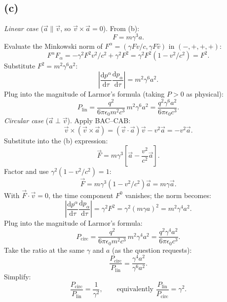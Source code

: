 \documentclass[11pt]{article}
\newcommand{\de}{\mathrm{d}}
\begin{document}
\subsection*{(c)}
\textit{Linear case} ($\vec a\parallel\vec v$, so $\vec v\times\vec a=0$). From (b):
\[ F=m\gamma^{3}a. \]
Evaluate the Minkowski norm of $F^{\alpha}=(\gamma Fv/c,\gamma F\hat v)$ in $(-,+,+,+)$:
\[ F^{\alpha}F_{\alpha}=-\gamma^{2}F^{2}v^{2}/c^{2}+\gamma^{2}F^{2}=\gamma^{2}F^{2}(1-v^{2}/c^{2})=F^{2}. \]
Substitute $F^{2}=m^{2}\gamma^{6}a^{2}$:
\[ \left|\frac{\de p^{\alpha}}{\de\tau}\frac{\de p_{\alpha}}{\de\tau}\right|=m^{2}\gamma^{6}a^{2}. \]
Plug into the magnitude of Larmor's formula (taking $P>0$ as physical):
\[ P_{\mathrm{lin}}=\frac{q^{2}}{6\pi\epsilon_{0}m^{2}c^{3}}\,m^{2}\gamma^{6}a^{2}=\frac{q^{2}\gamma^{6}a^{2}}{6\pi\epsilon_{0}c^{3}}. \]
\textit{Circular case} ($\vec a\perp\vec v$). Apply BAC--CAB:
\[ \vec v\times(\vec v\times\vec a)=(\vec v\cdot\vec a)\vec v-v^{2}\vec a=-v^{2}\vec a. \]
Substitute into the (b) expression:
\[ \vec F=m\gamma^{3}\!\left[\vec a-\frac{v^{2}}{c^{2}}\vec a\right]. \]
Factor and use $\gamma^{2}(1-v^{2}/c^{2})=1$:
\[ \vec F=m\gamma^{3}(1-v^{2}/c^{2})\vec a=m\gamma\vec a. \]
With $\vec F\cdot\vec v=0$, the time component $F^{0}$ vanishes; the norm becomes:
\[ \left|\frac{\de p^{\alpha}}{\de\tau}\frac{\de p_{\alpha}}{\de\tau}\right|=\gamma^{2}F^{2}=\gamma^{2}(m\gamma a)^{2}=m^{2}\gamma^{4}a^{2}. \]
Plug into the magnitude of Larmor's formula:
\[ P_{\mathrm{circ}}=\frac{q^{2}}{6\pi\epsilon_{0}m^{2}c^{3}}\,m^{2}\gamma^{4}a^{2}=\frac{q^{2}\gamma^{4}a^{2}}{6\pi\epsilon_{0}c^{3}}. \]
Take the ratio at the same $\gamma$ and $a$ (as the question requests):
\[ \frac{P_{\mathrm{circ}}}{P_{\mathrm{lin}}}=\frac{\gamma^{4}a^{2}}{\gamma^{6}a^{2}}. \]
Simplify:
\[ \boxed{\;\frac{P_{\mathrm{circ}}}{P_{\mathrm{lin}}}=\frac{1}{\gamma^{2}},\qquad\text{equivalently }\frac{P_{\mathrm{lin}}}{P_{\mathrm{circ}}}=\gamma^{2}.\;} \]
\end{document}
